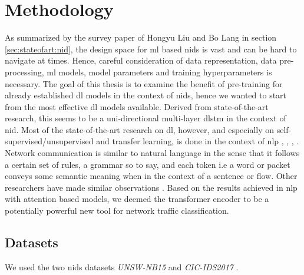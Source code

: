 \chapter{Methodology} \label{sec:methodology}

As summarized by the survey paper \cite{nid_ml_survey_2019} of Hongyu Liu and Bo Lang in section \ref{sec:stateofart:nid}, the design space for \gls{ml} based \gls{nids} is vast and can be hard to navigate at times. Hence, careful consideration of data representation, data pre-processing, \gls{ml} models, model parameters and training hyperparameters is necessary. The goal of this thesis is to examine the benefit of pre-training for already established \gls{dl} models in the context of \gls{nids}, hence we wanted to start from the most effective \gls{dl} models available. Derived from state-of-the-art research, this seems to be a uni-directional multi-layer \gls{dlstm} in the context of \gls{nid}. Most of the state-of-the-art research on \gls{dl}, however, and especially on self-supervised/unsupervised and transfer learning, is done in the context of \gls{nlp} \cite{bert}, \cite{elmo}, \cite{attention}, \cite{gpt3}. Network communication is similar to natural language in the sense that it follows a certain set of rules, a grammar so to say, and each token i.e a word or packet conveys some semantic meaning when in the context of a sentence or flow. Other researchers have made similar observations \cite{anomaly_detection_recurrent_neural_networks}. Based on the results achieved in \gls{nlp} with attention based models, we deemed the transformer encoder to be a potentially powerful new tool for network traffic classification. 

\section{Datasets} \label{sec:methodology:datasets}

We used the two \gls{nids} datasets \textit{UNSW-NB15} \cite{unsw_nb15} and \textit{CIC-IDS2017} \cite{cic_ids_2017}. \par

